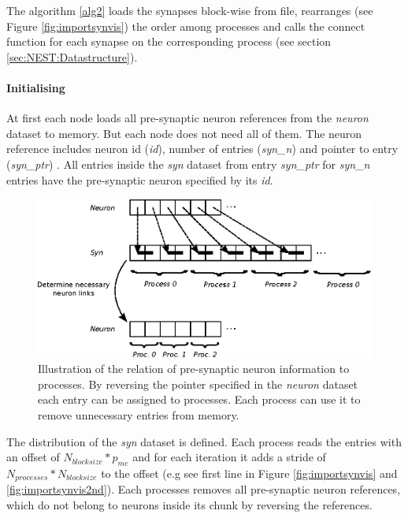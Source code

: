 The algorithm \ref{alg2} loads the synapses block-wise from file, rearranges (see Figure \ref{fig:importsynvis}) the order
among processes and calls the connect function for each synapse on the corresponding process (see section \ref{sec:NEST:Datastructure}).

\newpage
\paragraph{Initialising}
At first each node loads all pre-synaptic neuron references from the \emph{neuron} dataset to memory.
But each node does not need all of them. 
The neuron reference includes neuron id (\emph{id}), number of entries  (\emph{syn\_n}) and pointer to entry (\emph{syn\_ptr}) .
All entries inside the \emph{syn} dataset from  entry \emph{syn\_ptr} for \emph{syn\_n} entries have the pre-synaptic neuron specified by its \emph{id}.
\begin{figure}[ht!]
\centering
\includegraphics[scale=1.0]{pictures/NeuronLinksRemoving.eps}
\caption{Illustration of the relation of pre-synaptic neuron information to processes.
By reversing the pointer specified in the \emph{neuron} dataset
each entry can be assigned to processes.
Each process can use it to remove unnecessary entries from memory.
}
\label{fig:neuonlinksremoving}
\end{figure}
The distribution of the \emph{syn} dataset is defined.
Each process reads the entries with an offset of $N_{blocksize} * p_{me}$ and
for each iteration it adds a stride of $N_{processes} * N_{blocksize}$  to the offset (e.g see first line in Figure \ref{fig:importsynvis} and \ref{fig:importsynvis2nd}).
Each processes removes all pre-synaptic neuron references, which do not belong to
neurons inside its chunk by reversing the references.

